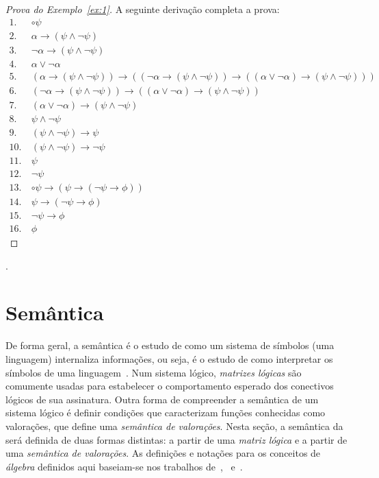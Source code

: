     \begin{proof}[Prova do Exemplo~\ref{ex:1}]
        A seguinte derivação completa a prova:
        \begin{align*}
            1.~& \circ \psi \tag{Premissa} \\
            2.~& \alpha \to (\psi \land \neg \psi) \tag{Premissa} \\
            3.~& \neg \alpha \to (\psi \land \neg \psi) \tag{Premissa} \\
            4.~& \alpha \lor \neg \alpha \tag{Ax10} \\
            5.~& (\alpha \to (\psi \land \neg \psi)) \to ((\neg \alpha \to (\psi \land \neg \psi)) \to ((\alpha \lor \neg \alpha) \to (\psi \land \neg \psi))) \tag{Ax8} \\
            6.~& (\neg \alpha \to (\psi \land \neg \psi)) \to ((\alpha \lor \neg \alpha) \to (\psi \land \neg \psi)) \tag{MP 2, 5}\\
            7.~& (\alpha \lor \neg \alpha) \to (\psi \land \neg \psi) \tag{MP 3, 6}\\
            8.~& \psi \land \neg \psi \tag{MP 4, 7} \\
            9.~& (\psi \land \neg \psi) \to \psi \tag{Ax4} \\
            10.~& (\psi \land \neg \psi) \to \neg \psi \tag{Ax5} \\
            11.~& \psi \tag{MP 8, 9}\\
            12.~& \neg \psi \tag{MP 8, 10}\\
            13.~& \circ \psi \to (\psi \to (\neg \psi \to \phi)) \tag{bc1}\\
            14.~& \psi \to (\neg \psi \to \phi) \tag{MP 1, 13}\\
            15.~& \neg \psi \to \phi \tag{MP 11, 14} \\
            16.~& \phi \tag{MP, 12, 15}
        \end{align*}
    \end{proof}

    .
\section{Semântica}\label{sec:semantica}
    De forma geral, a semântica é o estudo de como um sistema de símbolos (uma linguagem) internaliza informações, ou seja, é o estudo de como interpretar os símbolos de uma linguagem~\cite{brown2005encyclopedia}. Num sistema lógico, \textit{matrizes lógicas} são comumente usadas para estabelecer o comportamento esperado dos conectivos lógicos de sua assinatura. Outra forma de compreender a semântica de um sistema lógico é definir condições que caracterizam funções conhecidas como valorações, que define uma \textit{semântica de valorações}. Nesta seção, a semântica da \lfium{} será definida de duas formas distintas: a partir de uma \textit{matriz lógica} e a partir de uma \textit{semântica de valorações}. As definições e notações para os conceitos de \textit{álgebra} definidos aqui baseiam-se nos trabalhos de~,~ e~.
    
